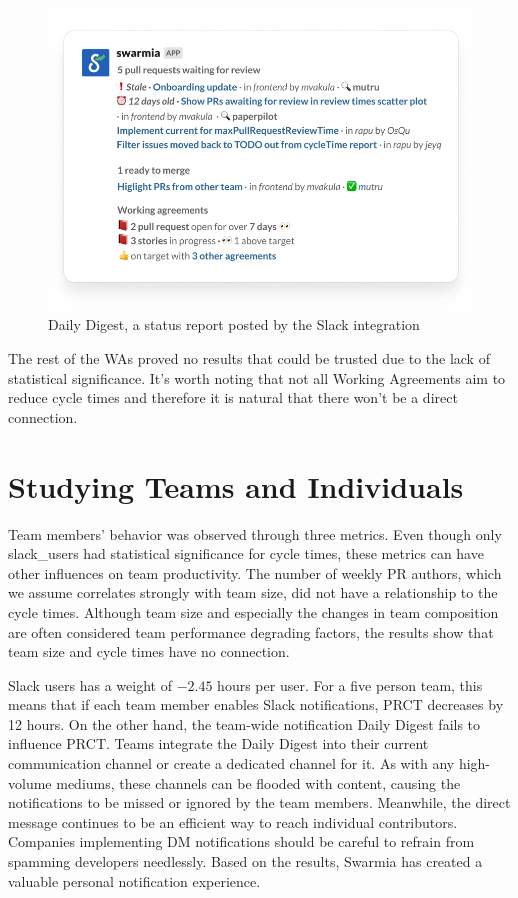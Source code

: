 \begin{figure}[ht]
    \centering
    \includegraphics[width=13.5cm]{LaTeX/images/daily-digest.png}
    \caption{Daily Digest, a status report posted by the Slack integration}
    \label{fig:daily_digest}
\end{figure}

The rest of the WAs proved no results that could be trusted due to the lack of statistical significance. It's worth noting that not all Working Agreements aim to reduce cycle times and therefore it is natural that there won't be a direct connection.

\section{Studying Teams and Individuals}

Team members' behavior was observed through three metrics. Even though only slack\_users had statistical significance for cycle times, these metrics can have other influences on team productivity. The number of weekly PR authors, which we assume correlates strongly with team size, did not have a relationship to the cycle times. Although team size and especially the changes in team composition are often considered team performance degrading factors, the results show that team size and cycle times have no connection. 

Slack users has a weight of $-2.45$ hours per user. For a five person team, this means that if each team member enables Slack notifications, PRCT decreases by 12 hours. On the other hand, the team-wide notification Daily Digest fails to influence PRCT. Teams integrate the Daily Digest into their current communication channel or create a dedicated channel for it. As with any high-volume mediums, these channels can be flooded with content, causing the notifications to be missed or ignored by the team members. Meanwhile, the direct message continues to be an efficient way to reach individual contributors. Companies implementing DM notifications should be careful to refrain from spamming developers needlessly. Based on the results, Swarmia has created a valuable personal notification experience. 

